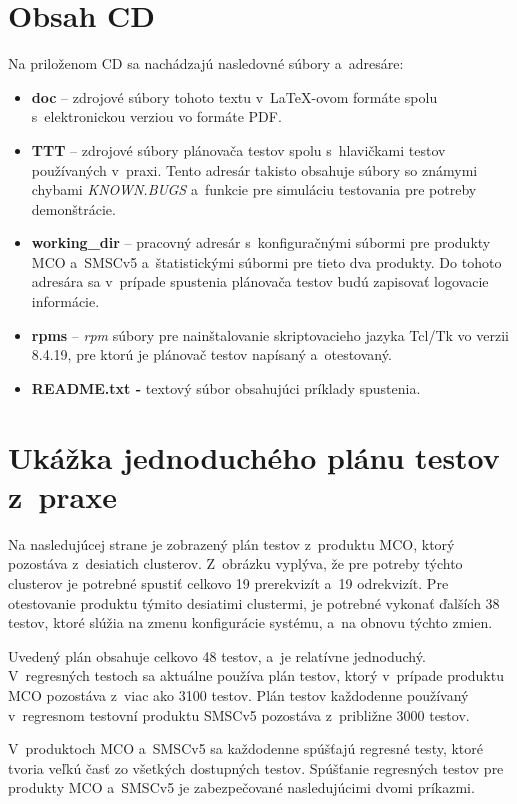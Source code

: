 %
%
\chapter{Obsah CD}
Na priloženom CD sa nachádzajú nasledovné súbory a~adresáre:
\begin{itemize}
\item \textbf{doc} -- zdrojové súbory tohoto textu v~\LaTeX-ovom formáte 
spolu s~elektronickou verziou vo formáte PDF.
\item \textbf{TTT} -- zdrojové súbory plánovača testov spolu s~hlavičkami 
testov používaných v~praxi. Tento adresár takisto obsahuje súbory 
so známymi chybami \textit{KNOWN.BUGS} a~funkcie pre simuláciu testovania
pre potreby demonštrácie.
\item \textbf{working\_dir} -- pracovný adresár s~konfiguračnými súbormi
pre produkty MCO a~SMSCv5 a~štatistickými súbormi pre tieto dva produkty.
Do tohoto adresára sa v~prípade spustenia plánovača testov budú zapisovať
logovacie informácie.
\item \textbf{rpms} -- \textit{rpm} súbory pre nainštalovanie 
skriptovacieho jazyka Tcl/Tk vo verzii 8.4.19, pre ktorú je plánovač 
testov napísaný a~otestovaný.
\item \textbf{README.txt -} textový súbor obsahujúci príklady spustenia.
\end{itemize}



%
%
\chapter{Ukážka jednoduchého plánu testov z~praxe}
\label{priloha:jednoduchy_plan_testov}
Na nasledujúcej strane je zobrazený plán testov z~produktu MCO,
ktorý pozostáva z~desiatich clusterov. Z~obrázku vyplýva, že pre potreby
týchto clusterov je potrebné spustiť celkovo 19 prerekvizít a~19 
odrekvizít. Pre otestovanie produktu týmito desiatimi clustermi, je 
potrebné vykonať ďalších 38 testov, ktoré slúžia na zmenu konfigurácie
systému, a~na obnovu týchto zmien. 

Uvedený plán obsahuje celkovo 48 testov, a~je relatívne jednoduchý.
V~regresných testoch sa aktuálne používa plán testov, ktorý v~prípade 
produktu MCO pozostáva z~viac ako 3100 testov.
Plán testov každodenne používaný v~regresnom testovní produktu SMSCv5 
pozostáva z~približne 3000 testov.

V~produktoch MCO a~SMSCv5 sa každodenne spúšťajú regresné testy, ktoré
tvoria veľkú časť zo všetkých dostupných testov.
Spúšťanie regresných testov pre produkty MCO a~SMSCv5 je zabezpečované 
nasledujúcimi dvomi príkazmi.

